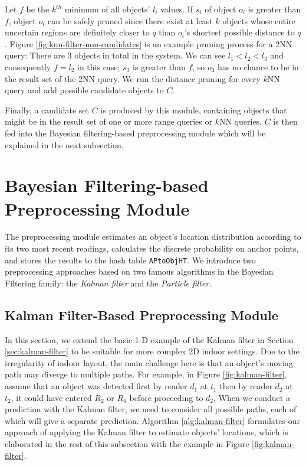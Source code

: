 \documentclass[12pt]{report}
\begin{document}
Let \(f\) be the \(k^{th}\) minimum of all objects' \(l_i\)
values.  If \(s_i\) of object \(o_i\) is greater than \(f\),
object \(o_i\) can be safely pruned since there exist at least
\(k\) objects whose entire uncertain regions are definitely closer
to \(q\) than \(o_i\)'s shortest possible distance to \(q\).
Figure \ref{fig:knn-filter-non-candidates} is an example pruning process
for a 2NN query: There are 3 objects in total in the system.  We
can see \(l_1<l_2<l_3\) and consequently \(f=l_2\) in this case;
\(s_3\) is greater than \(f\), so \(o_3\) has no chance to be in
the result set of the 2NN query.  We run the distance pruning for
every \(k\)NN query and add possible candidate objects to \(C\).

Finally, a candidate set \(C\) is produced by this module,
containing objects that might be in the result set of one or more
range queries or \(k\)NN queries.  \(C\) is then fed into the
Bayesian filtering-based preprocessing module which will be
explained in the next subsection.

\chapter{Bayesian Filtering-based Preprocessing Module}
\label{sec:preprocessing-module}
The preprocessing module estimates an object's location
distribution according to its two most recent readings, calculates
the discrete probability on anchor points, and stores the results
to the hash table \texttt{APtoObjHT}.  We introduce two preprocessing
approaches based on two famous algorithms in the Bayesian Filtering
family: the \emph{Kalman filter} and the \emph{Particle filter}.

\section{Kalman Filter-Based Preprocessing Module}
\label{sec:kalman-filter-preprocessing}
In this section, we extend the basic 1-D example of the Kalman
filter in Section \ref{sec:kalman-filter} to be suitable for more
complex 2D indoor settings.  Due to the irregularity of indoor
layout, the main challenge here is that an object's moving path
may diverge to multiple paths.  For example, in Figure
\ref{fig:kalman-filter}, assume that an object was detected first by
reader \(d_1\) at \(t_1\) then by reader \(d_2\) at \(t_2\), it
could have entered \(R_2\) or \(R_6\) before proceeding to
\(d_2\).  When we conduct a prediction with the Kalman filter, we
need to consider all possible paths, each of which will give a
separate prediction.  Algorithm \ref{alg:kalman-filter} formulates
our approach of applying the Kalman filter to estimate objects'
locations, which is elaborated in the rest of this subsection with
the example in Figure \ref{fig:kalman-filter}.
\end{document}

